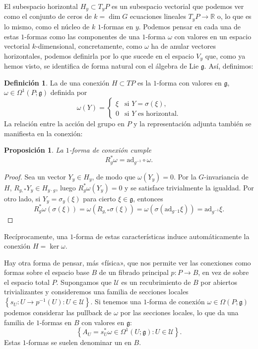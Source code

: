 \documentclass[12pt,a4paper]{article}
\newtheorem{prop}[thm]{Proposición}
\theoremstyle{definition} \newtheorem{defn}[thm]{Definición}
\theoremstyle{definition} \newtheorem{ejemplo}[thm]{Ejemplo}
\theoremstyle{definition} \newtheorem{ejercicio}[thm]{Ejercicio}
\theoremstyle{remark} \newtheorem*{obs}{Observación}
\def\gg{\mathfrak{g}}
\def\ad{\mathrm{ad}}
\def\RR{\mathbb{R}}
\let\emph\relax
\begin{document}
	El subespacio horizontal $H_y\subset T_yP$ es un subespacio vectorial que podemos ver como el conjunto de ceros de $k=\dim G$ ecuaciones lineales $T_yP \rightarrow \RR$ o, lo que es lo mismo, como el núcleo de $k$ $1$-formas en $y$. Podemos pensar en cada una de estas $1$-formas como las componentes de una $1$-forma $\omega$ con valores en un espacio vectorial $k$-dimensional, concretamente, como $\omega$ ha de anular vectores horizontales, podemos definirla por lo que sucede en el espacio $V_y$ que, como ya hemos visto, se identifica de forma natural con el álgebra de Lie $\gg$. Así, definimos:
	\begin{defn}
	  La \emph{$1$-forma de conexión} de una conexión $H\subset TP$ es la $1$-forma con valores en $\gg$, $\omega\in \Omega^1(P;\gg)$ definida por
	  \begin{equation*}
	    \omega(Y)=
	    \begin{cases}
	      \xi & \text{si } Y=\sigma(\xi), \\
	      0 & \text{si } Y \text{ es horizontal.}
	    \end{cases}
	  \end{equation*}
	  La relación entre la acción del grupo en $P$ y la representación adjunta también se manifiesta en la conexión:
	  \begin{prop}
	    La $1$-forma de conexión cumple
	    \begin{equation*}
	      R^*_g\omega=\ad_{g^{-1}}\circ \omega.
	    \end{equation*}
	  \end{prop}
	  \begin{proof}
	    Sea un vector $Y_y\in H_y$, de modo que $\omega(Y_y)=0$. Por la $G$-invariancia de $H$, $R_{g,*}Y_y\in H_{y\cdot g}$, luego $R_g^* \omega(Y_y)=0$ y se satisface trivialmente la igualdad. Por otro lado, si $Y_y=\sigma_y(\xi)$ para cierto $\xi \in \gg$, entonces
	    \begin{equation*}
	      R_g^*\omega(\sigma(\xi))=\omega(R_{g,*}\sigma(\xi))=\omega(\sigma(\ad_{g^-1}\xi))=\ad_{g^{-1}}\xi.
	    \end{equation*}
	  \end{proof}
	\end{defn}
	Recíprocamente, una $1$-forma de estas características induce automáticamente la conexión $H=\ker \omega$.

	Hay otra forma de pensar, más «física», que nos permite ver las conexiones como formas sobre el espacio base $B$ de un fibrado principal $p:P\rightarrow B$, en vez de sobre el espacio total $P$. Supongamos que $\mathcal{U}$ es un recubrimiento de $B$ por abiertos trivializantes y consideremos una familia de secciones locales $\left\{ s_U:U\rightarrow p^{-1}(U):U\in \mathcal{U} \right\}$. Si tenemos una $1$-forma de conexión $\omega \in \Omega(P;\gg)$ podemos considerar las pullback de $\omega$ por las secciones locales, lo que da una familia de $1$-formas en $B$ con valores en $\gg$: 
	\begin{equation*}
	  \left\{ A_U=s_U^*\omega \in \Omega^1(U;\gg): U\in \mathcal{U} \right\}.
	\end{equation*}
	Estas $1$-formas se suelen denominar un \emph{campo gauge} en $B$.
\end{document}
